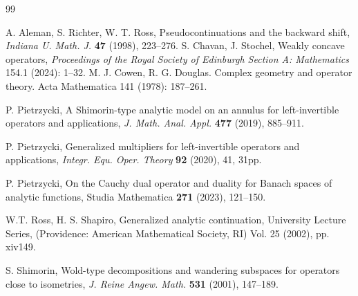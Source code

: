 \documentclass[reqno]{amsproc}
\numberwithin{equation}{section}
\theoremstyle{remark}
\theoremstyle{definition}
\begin{document}
   \begin{thebibliography}{99} 

 A. Aleman, S. Richter, W. T. Ross,   Pseudocontinuations and the backward shift, {\em Indiana U. Math. J.} {\bf 47} (1998), 223--276.
 S. Chavan, J. Stochel, Weakly concave operators, {\em Proceedings of the Royal Society of Edinburgh Section A: Mathematics} 154.1 (2024): 1--32.
 M. J. Cowen, R. G. Douglas. Complex geometry and operator theory. Acta Mathematica 141 (1978): 187--261.



 P. Pietrzycki, A Shimorin-type analytic model on an annulus for left-invertible
operators and applications, {\em J. Math. Anal. Appl.} {\bf 477} (2019), 885--911.

 { P. Pietrzycki},  Generalized multipliers for left-invertible operators and applications, {\em Integr. Equ. Oper. Theory} {\bf 92} (2020), 41, 31pp.

 { P. Pietrzycki}, On the Cauchy dual operator and duality for Banach spaces of analytic functions, Studia Mathematica {\bf 271} (2023), 121--150.


 W.T. Ross,  H. S. Shapiro,  Generalized analytic continuation, University Lecture Series,
 (Providence: American Mathematical Society, RI) Vol. 25 (2002), pp. xiv149.


S. Shimorin,  Wold-type decompositions and wandering subspaces for operators close to isometries,\textit{ J. Reine Angew. Math.} \textbf{531} (2001), 147--189.

   \end{thebibliography}
   
\end{document}
